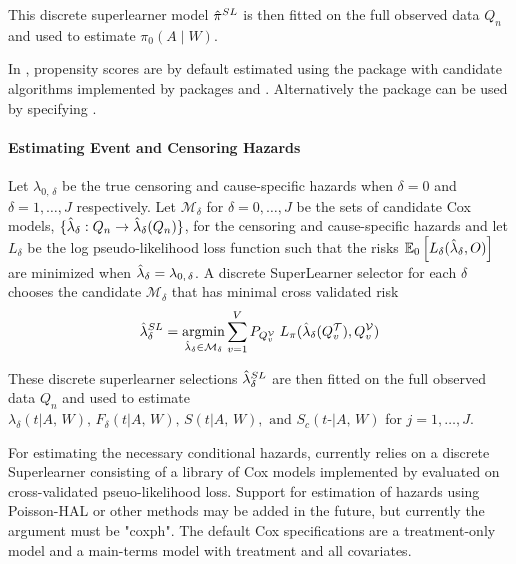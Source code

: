 \documentclass{report}
\DeclareMathOperator*{\argmin}{argmin}
\newcommand{\1}{\ensuremath{\mathbf{1}}}
\newcommand{\X}{\ensuremath{{W}}}
\newcommand{\AX}{\ensuremath{\mid A,\,{W}}}
\newcommand{\g}{\ensuremath{\pi}}
\begin{document}
This discrete superlearner model \(\Hat{\g}^{SL}\) is then fitted on the full observed data \(Q_n\) and used to estimate \(\g_0(A \mid \X)\).

In , propensity scores are by default estimated using the 
package  with candidate algorithms  implemented by packages  and . Alternatively the  package can be used by specifying .

\paragraph{Estimating Event and Censoring Hazards}
\label{HazardEstimation}
Let \(\lambda_{0,\,\delta}\) be the true censoring and cause-specific hazards when \(\delta = 0\) and \(\delta = 1, \dots, J\) respectively. Let \(\mathcal{M}_\delta\) for \(\delta = 0, \dots, J\) be the sets of candidate Cox models, \(\{\Hat{\lambda}_\delta : Q_n \to \Hat{\lambda}_\delta(Q_n)\}\), for the censoring and cause-specific hazards and let \(L_\delta\) be the log pseudo-likelihood loss function such that the risks \(\mathbb{E}_0\left[L_\delta(\Hat{\lambda}_\delta, O)\right]\) are minimized when \(\Hat{\lambda}_\delta = \lambda_{0,\,\delta}\). A discrete SuperLearner selector for each \(\delta\) chooses the candidate \(\mathcal{M_\delta}\) that has minimal cross validated risk 
\[ \Hat{\lambda}_\delta^{SL} = \argmin_{\Hat{\lambda}_\delta \in \mathcal{M}_\delta} \sum_{v = 1}^{V} P_{Q^\mathcal{V}_v} \; L_\g(\Hat{\lambda}_\delta(Q^\mathcal{T}_v), Q^\mathcal{V}_v)\]

These discrete superlearner selections \(\Hat{\lambda}_\delta^{SL}\) are then fitted on the full observed data \(Q_n\) and used to estimate \(\lambda_\delta(t \AX), \, F_\delta(t \AX),\, S(t \AX), \text{ and } S_c(t\text{-} \AX)\) for \(j = 1,\dots, J\).

For estimating the necessary conditional hazards,  currently relies on a discrete Superlearner consisting of a library of Cox models implemented by  evaluated on cross-validated pseuo-likelihood loss. Support for estimation of hazards using Poisson-HAL or other methods may be added in the future, but currently the  argument must be "coxph". The default Cox specifications are a treatment-only model and a main-terms model with treatment and all covariates.  
\end{document}
